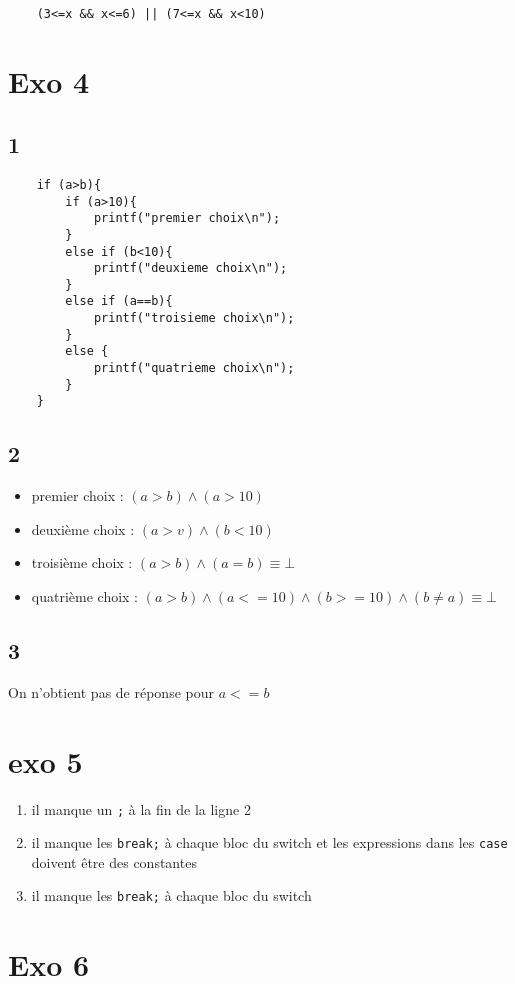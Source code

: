 \documentclass{article}
\begin{document}
\begin{lstlisting}

    (3<=x && x<=6) || (7<=x && x<10)

\end{lstlisting}

\section{Exo 4}

\subsection{1}

\begin{lstlisting}
    if (a>b){
        if (a>10){
            printf("premier choix\n");
        }
        else if (b<10){
            printf("deuxieme choix\n");
        }
        else if (a==b){
            printf("troisieme choix\n");
        }
        else {
            printf("quatrieme choix\n");
        }
    }
\end{lstlisting}

\subsection{2}

\begin{itemize}
    \item premier choix : $(a>b)\wedge(a>10)$
    \item deuxième choix : $(a>v)\wedge (b<10)$
    \item troisième choix : $(a>b) \wedge (a=b) \equiv \bot $
    \item quatrième choix : $(a>b) \wedge (a<=10) \wedge (b>=10) \wedge (b\neq a) \equiv \bot$
\end{itemize}

\subsection{3}

On n'obtient pas de réponse pour $a<=b$

\section{exo 5}

\begin{enumerate}
    \item il manque un \texttt{;} à la fin de la ligne 2
    \item il manque les \texttt{break;} à chaque bloc du switch 
    et les expressions dans les \texttt{case} doivent être des constantes
    \item il manque les \texttt{break;} à chaque bloc du switch
\end{enumerate}

\section{Exo 6}
\end{document}
